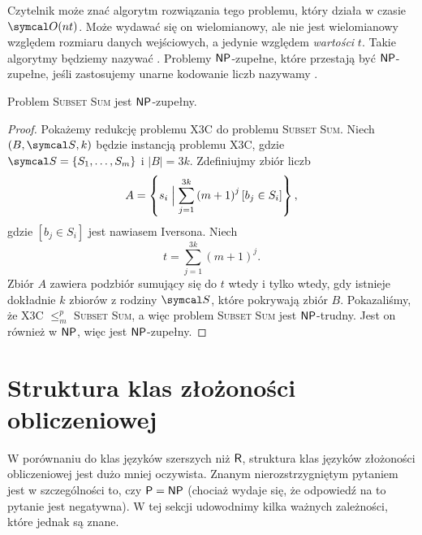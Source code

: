 Czytelnik może znać algorytm rozwiązania tego problemu, który działa w czasie $\sO(nt)$. Może wydawać się on wielomianowy, ale nie jest wielomianowy względem rozmiaru danych wejściowych, a jedynie względem \textit{wartości} $t$. Takie algorytmy będziemy nazywać . Problemy $\textsf{NP}$-zupełne, które przestają być $\textsf{NP}$-zupełne, jeśli zastosujemy unarne kodowanie liczb nazywamy .

\begin{theorem}
    Problem \textsc{Subset Sum} jest $\textsf{NP}$-zupełny.
\end{theorem}
\begin{proof}
    Pokażemy redukcję problemu X3C do problemu \textsc{Subset Sum}. Niech $(B, \sS, k)$ będzie instancją problemu X3C, gdzie $\sS = \{S_1, \ldots, S_m\}$ i $|B| = 3k$. Zdefiniujmy zbiór liczb
    \[ A = \left\{s_i \Bigm| \sum_{j=1}^{3k} \left(m + 1\right)^j \left[b_j \in S_i\right]\right\}, \]
    gdzie $\left[b_j \in S_i\right]$ jest nawiasem Iversona. Niech
    \[ t = \sum_{j=1}^{3k} (m + 1)^j. \]
    Zbiór $A$ zawiera podzbiór sumujący się do $t$ wtedy i tylko wtedy, gdy istnieje dokładnie $k$ zbiorów z rodziny $\sS$, które pokrywają zbiór $B$.
    Pokazaliśmy, że X3C $\leq_m^p$ \textsc{Subset Sum}, a więc problem \textsc{Subset Sum} jest $\textsf{NP}$-trudny. Jest on również w $\textsf{NP}$, więc jest $\textsf{NP}$-zupełny.
\end{proof}

\section{Struktura klas złożoności obliczeniowej}

W porównaniu do klas języków szerszych niż $\textsf{R}$, struktura klas języków złożoności obliczeniowej jest dużo mniej oczywista. Znanym nierozstrzygniętym pytaniem jest w szczególności to, czy $\textsf{P} = \textsf{NP}$ (chociaż wydaje się, że odpowiedź na to pytanie jest negatywna). W tej sekcji udowodnimy kilka ważnych zależności, które jednak są znane.


